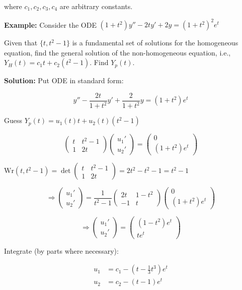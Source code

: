 \documentclass{article}
\begin{document}
where $c_1, c_2, c_3, c_4$ are arbitrary constants.

\textbf{Example:} Consider the ODE $(1+t^2)y''-2ty'+2y = (1+t^2)^2e^t$

Given that $\{t, t^2-1\}$ is a fundamental set of solutions for the homogeneous equation, find the general solution of the
non-homogeneous equation, i.e., $Y_H(t) = c_1t + c_2(t^2-1)$. Find $Y_p(t)$.

\textbf{Solution:} Put ODE in standard form:

\[y'' - \frac{2t}{1+t^2}y' + \frac{2}{1+t^2}y = (1+t^2)e^t\]

Guess $Y_p(t) = u_1(t)t + u_2(t)(t^2-1)$

\[\begin{pmatrix}
t & t^2-1 \\
1 & 2t
\end{pmatrix} 
\begin{pmatrix}
u_1' \\ u_2'
\end{pmatrix} = 
\begin{pmatrix}
0 \\ (1+t^2)e^t
\end{pmatrix}\]

$\text{Wr}(t, t^2-1) = \det\begin{pmatrix}
t & t^2-1 \\
1 & 2t
\end{pmatrix} = 2t^2-t^2-1 = t^2-1$

\[\Rightarrow \begin{pmatrix}
u_1' \\ u_2'
\end{pmatrix} = 
\frac{1}{t^2-1}\begin{pmatrix}
2t & 1-t^2 \\
-1 & t
\end{pmatrix} 
\begin{pmatrix}
0 \\ (1+t^2)e^t
\end{pmatrix}\]

\[\Rightarrow \begin{pmatrix}
u_1' \\ u_2'
\end{pmatrix} = 
\begin{pmatrix}
(1-t^2)e^t \\ te^t
\end{pmatrix}\]

Integrate (by parts where necessary):

\begin{align*}
u_1 &= c_1 - (t-\frac{1}{3}t^3)e^t \\
u_2 &= c_2 - (t-1)e^t
\end{align*}
\end{document}

